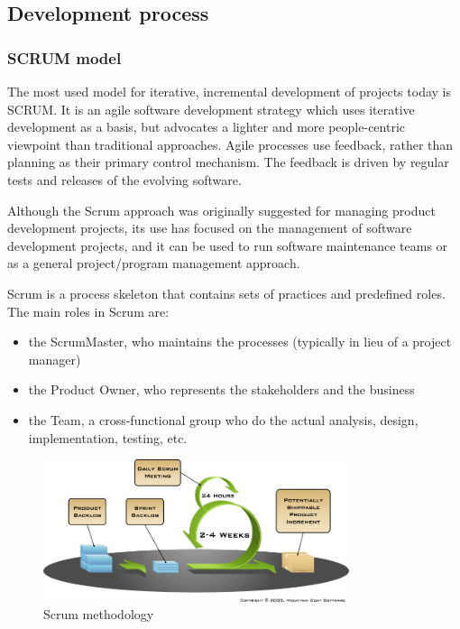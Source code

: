 \subsection{Development process}

\subsubsection{SCRUM model}
	
The most used model for iterative, incremental development of projects today
is SCRUM\cite{scrumi}. It is an agile software development strategy which uses iterative
development as a basis, but advocates a lighter and more people-centric viewpoint
than traditional approaches. Agile processes use feedback, rather than planning
as their primary control mechanism. The feedback is driven by regular tests and
releases of the evolving software\cite{wiki:development-process}.\newline
	
Although the Scrum approach was originally suggested for managing product development
projects, its use has focused on the management of software development projects,
and it can be used to run software maintenance teams or as a general
project/program management approach.\newline
	
Scrum is a process skeleton that contains sets of practices and predefined roles.
The main roles in Scrum are:	
\begin{itemize}
	\item the ScrumMaster, who maintains the processes (typically in lieu of a project manager)
	\item the Product Owner, who represents the stakeholders and the business
	\item the Team, a cross-functional group who do the actual analysis, design, implementation, testing, etc.
\end{itemize}

\begin{figure}[htb]
	\centering
	\includegraphics[width=0.8\textwidth]{prestudy/development_process/scrum.png}
	\caption{Scrum methodology\cite{targetprocess:scrum}}
	\label{fig:scrum-methology}
\end{figure}

